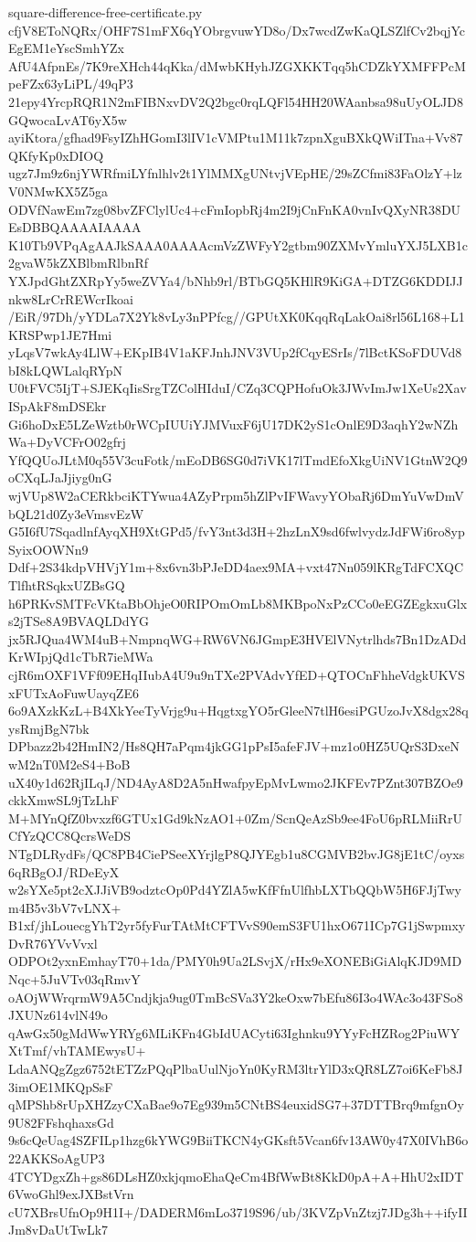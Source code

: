 \documentclass[11pt]{article}
\theoremstyle{definition}
\theoremstyle{remark}
\begin{document}
\begin{filecontents*}[overwrite]{square-difference-free-certificate.py}
cfjV8EToNQRx/OHF7S1mFX6qYObrgvuwYD8o/Dx7wcdZwKaQLSZlfCv2bqjYcEgEM1eYscSmhYZx
AfU4AfpnEs/7K9reXHch44qKka/dMwbKHyhJZGXKKTqq5hCDZkYXMFFPcMpeFZx63yLiPL/49qP3
21epy4YrcpRQR1N2mFIBNxvDV2Q2bgc0rqLQFl54HH20WAanbsa98uUyOLJD8GQwocaLvAT6yX5w
ayiKtora/gfhad9FsyIZhHGomI3lIV1cVMPtu1M11k7zpnXguBXkQWiITna+Vv87QKfyKp0xDIOQ
ugz7Jm9z6njYWRfmiLYfnlhlv2t1YlMMXgUNtvjVEpHE/29sZCfmi83FaOlzY+lzV0NMwKX5Z5ga
ODVfNawEm7zg08bvZFClylUc4+cFmIopbRj4m2I9jCnFnKA0vnIvQXyNR38DUEsDBBQAAAAIAAAA
K10Tb9VPqAgAAJkSAAA0AAAAcmVzZWFyY2gtbm90ZXMvYmluYXJ5LXB1c2gvaW5kZXBlbmRlbnRf
YXJpdGhtZXRpYy5weZVYa4/bNhb9rl/BTbGQ5KHlR9KiGA+DTZG6KDDIJJnkw8LrCrREWcrIkoai
/EiR/97Dh/yYDLa7X2Yk8vLy3nPPfcg//GPUtXK0KqqRqLakOai8rl56L168+L1KRSPwp1JE7Hmi
yLqsV7wkAy4LlW+EKpIB4V1aKFJnhJNV3VUp2fCqyESrIs/7lBctKSoFDUVd8bI8kLQWLalqRYpN
U0tFVC5IjT+SJEKqIisSrgTZColHIduI/CZq3CQPHofuOk3JWvImJw1XeUs2XavISpAkF8mDSEkr
Gi6hoDxE5LZeWztb0rWCpIUUiYJMVuxF6jU17DK2yS1cOnlE9D3aqhY2wNZhWa+DyVCFrO02gfrj
YfQQUoJLtM0q55V3cuFotk/mEoDB6SG0d7iVK17lTmdEfoXkgUiNV1GtnW2Q9oCXqLJaJjiyg0nG
wjVUp8W2aCERkbciKTYwua4AZyPrpm5hZlPvIFWavyYObaRj6DmYuVwDmVbQL21d0Zy3eVmsvEzW
G5I6fU7SqadlnfAyqXH9XtGPd5/fvY3nt3d3H+2hzLnX9sd6fwlvydzJdFWi6ro8ypSyixOOWNn9
Ddf+2S34kdpVHVjY1m+8x6vn3bPJeDD4aex9MA+vxt47Nn059lKRgTdFCXQCTlfhtRSqkxUZBsGQ
h6PRKvSMTFcVKtaBbOhjeO0RIPOmOmLb8MKBpoNxPzCCo0eEGZEgkxuGlxs2jTSe8A9BVAQLDdYG
jx5RJQua4WM4uB+NmpnqWG+RW6VN6JGmpE3HVElVNytrlhds7Bn1DzADdKrWIpjQd1cTbR7ieMWa
cjR6mOXF1VFf09EHqIIubA4U9u9nTXe2PVAdvYfED+QTOCnFhheVdgkUKVSxFUTxAoFuwUayqZE6
6o9AXzkKzL+B4XkYeeTyVrjg9u+HqgtxgYO5rGleeN7tlH6esiPGUzoJvX8dgx28qysRmjBgN7bk
DPbazz2b42HmIN2/Hs8QH7aPqm4jkGG1pPsI5afeFJV+mz1o0HZ5UQrS3DxeNwM2nT0M2eS4+BoB
uX40y1d62RjILqJ/ND4AyA8D2A5nHwafpyEpMvLwmo2JKFEv7PZnt307BZOe9ckkXmwSL9jTzLhF
M+MYnQfZ0bvxzf6GTUx1Gd9kNzAO1+0Zm/ScnQeAzSb9ee4FoU6pRLMiiRrUCfYzQCC8QcrsWeDS
NTgDLRydFs/QC8PB4CiePSeeXYrjlgP8QJYEgb1u8CGMVB2bvJG8jE1tC/oyxs6qRBgOJ/RDeEyX
w2sYXe5pt2cXJJiVB9odztcOp0Pd4YZlA5wKfFfnUlfhbLXTbQQbW5H6FJjTwym4B5v3bV7vLNX+
B1xf/jhLouecgYhT2yr5fyFurTAtMtCFTVvS90emS3FU1hxO671ICp7G1jSwpmxyDvR76YVvVvxl
ODPOt2yxnEmhayT70+1da/PMY0h9Ua2LSvjX/rHx9eXONEBiGiAlqKJD9MDNqc+5JuVTv03qRmvY
oAOjWWrqrmW9A5Cndjkja9ug0TmBcSVa3Y2keOxw7bEfu86I3o4WAc3o43FSo8JXUNz614vlN49o
qAwGx50gMdWwYRYg6MLiKFn4GbIdUACyti63Ighnku9YYyFcHZRog2PiuWYXtTmf/vhTAMEwysU+
LdaANQgZgz6752tETZzPQqPlbaUulNjoYn0KyRM3ltrYlD3xQR8LZ7oi6KeFb8J3imOE1MKQpSsF
qMPShb8rUpXHZzyCXaBae9o7Eg939m5CNtBS4euxidSG7+37DTTBrq9mfgnOy9U82FFshqhaxsGd
9s6cQeUag4SZFILp1hzg6kYWG9BiiTKCN4yGKsft5Vcan6fv13AW0y47X0IVhB6o22AKKSoAgUP3
4TCYDgxZh+gs86DLsHZ0xkjqmoEhaQeCm4BfWwBt8KkD0pA+A+HhU2xIDT6VwoGhl9exJXBstVrn
cU7XBrsUfnOp9H1I+/DADERM6mLo3719S96/ub/3KVZpVnZtzj7JDg3h++ifyIIJm8vDaUtTwLk7

\end{filecontents*}
\end{document}
